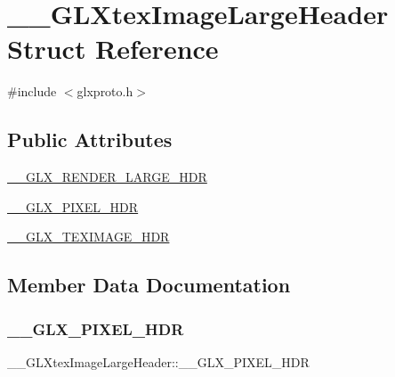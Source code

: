 \hypertarget{struct_____g_l_xtex_image_large_header}{}\section{\+\_\+\+\_\+\+G\+L\+Xtex\+Image\+Large\+Header Struct Reference}
\label{struct_____g_l_xtex_image_large_header}


{\ttfamily \#include $<$glxproto.\+h$>$}

\subsection*{Public Attributes}
\begin{DoxyCompactItemize}
\item 
\hyperlink{struct_____g_l_xtex_image_large_header_a8109276ccca50148f45a453f4a24ba14}{\+\_\+\+\_\+\+G\+L\+X\+\_\+\+R\+E\+N\+D\+E\+R\+\_\+\+L\+A\+R\+G\+E\+\_\+\+H\+DR}
\item 
\hyperlink{struct_____g_l_xtex_image_large_header_ad1daf3d2be4b449931dac0596fdfae1f}{\+\_\+\+\_\+\+G\+L\+X\+\_\+\+P\+I\+X\+E\+L\+\_\+\+H\+DR}
\item 
\hyperlink{struct_____g_l_xtex_image_large_header_ad75599295392c881a7b90c189f41830d}{\+\_\+\+\_\+\+G\+L\+X\+\_\+\+T\+E\+X\+I\+M\+A\+G\+E\+\_\+\+H\+DR}
\end{DoxyCompactItemize}


\subsection{Member Data Documentation}
\mbox{\label{struct_____g_l_xtex_image_large_header_ad1daf3d2be4b449931dac0596fdfae1f}} 
\subsubsection{\texorpdfstring{\+\_\+\+\_\+\+G\+L\+X\+\_\+\+P\+I\+X\+E\+L\+\_\+\+H\+DR}{\_\_GLX\_PIXEL\_HDR}}
{\footnotesize\ttfamily \+\_\+\+\_\+\+G\+L\+Xtex\+Image\+Large\+Header\+::\+\_\+\+\_\+\+G\+L\+X\+\_\+\+P\+I\+X\+E\+L\+\_\+\+H\+DR}

